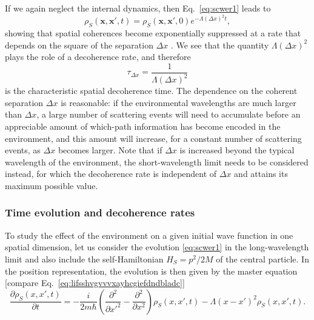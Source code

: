 \documentclass[3p,sort&compress,12pt]{elsarticle}
\newcommand{\E}{\ensuremath{e}}
\newcommand{\I}{\ensuremath{i}}
\newcommand{\op}[1]{#1}
\renewcommand{\vec}[1]{\ensuremath{\mathbf{#1}}}
\begin{document}
If we again neglect the internal dynamics, then Eq.~\eqref{eq:scwer1}  leads to
%
\begin{equation}\label{eq:scwer2}
\rho_S(\vec{x},\vec{x}',t) =
\rho_S(\vec{x},\vec{x}',0) \E^{-\Lambda (\Delta x)^2 t},
\end{equation}
%
showing that spatial coherences become exponentially suppressed at a rate that depends on the square of the separation $\Delta x$ \cite{Schlosshauer:2007:un}. We see that the quantity $\Lambda (\Delta x)^2$ plays the role of a decoherence rate, and therefore
%
\begin{equation}\label{eq:scwer6565}
  \tau_{\Delta x} = \frac{1}{\Lambda (\Delta x)^2}
\end{equation}
%
is the characteristic spatial decoherence time. The dependence on the coherent separation $\Delta x$ is reasonable: if the environmental wavelengths are much larger than $\Delta x$, a large number of scattering events will need to accumulate before an appreciable amount of which-path information has become encoded in the environment, and this amount will increase, for a constant number of scattering events, as $\Delta x$ becomes larger. Note that if $\Delta x$ is increased beyond the typical wavelength of the environment, the short-wavelength limit needs to be considered instead, for which the decoherence rate is independent of $\Delta x$ and attains its maximum possible value.

\subsubsection{Time evolution and decoherence rates}

To study the effect of the environment on a given initial wave function in one spatial dimension, let us consider the evolution \eqref{eq:scwer1} in the long-wavelength limit and also include the self-Hamiltonian $\op{H}_S=\op{p}^2/2M$ of the central particle. In the position representation, the evolution is then given by the master equation [compare Eq.~\eqref{eq:lifsshvgvvvxayhcgiefdndbladc}]
%
\begin{equation}\label{eq:scweraass1hallo} 
   \frac{\partial\rho_{S}(x,x',t)}{\partial t} =  -\frac{\I}{2m\hbar}
  \left(\frac{ \partial^2}{\partial x'^2} - \frac{ \partial^2}{\partial
      x^2} \right) \rho_{S}(x,x',t)  -  \Lambda
  (x-x')^2   \rho_{S}(x,x',t). 
\end{equation}
% 
\end{document}
